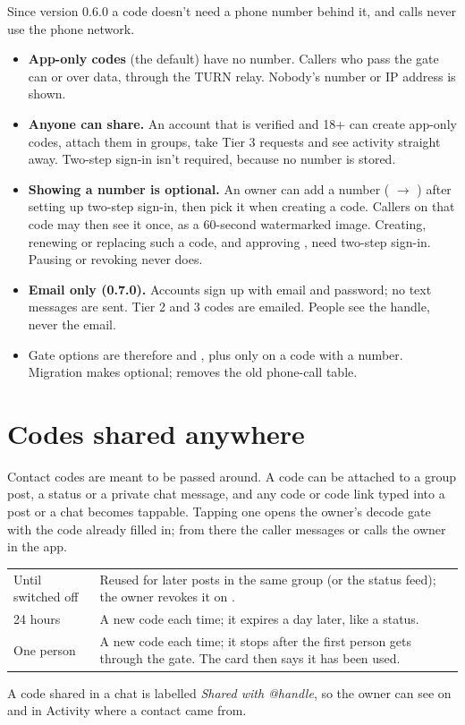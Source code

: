 Since version 0.6.0 a code doesn't need a phone number behind it, and calls never use the phone network.
\begin{itemize}
  \item \textbf{App-only codes} (the default) have no number. Callers who pass the gate can  or  over data, through the TURN relay. Nobody's number or IP address is shown.
  \item \textbf{Anyone can share.} An account that is verified and 18+ can create app-only codes, attach them in groups, take Tier 3 requests and see activity straight away. Two-step sign-in isn't required, because no number is stored.
  \item \textbf{Showing a number is optional.} An owner can add a number ( $\rightarrow$ ) after setting up two-step sign-in, then pick it when creating a code. Callers on that code may then see it once, as a 60-second watermarked image. Creating, renewing or replacing such a code, and approving , need two-step sign-in. Pausing or revoking never does.
  \item \textbf{Email only (0.7.0).} Accounts sign up with email and password; no text messages are sent. Tier 2 and 3 codes are emailed. People see the handle, never the email.
  \item Gate options are therefore  and , plus  only on a code with a number. Migration  makes  optional;  removes the old phone-call table.
\end{itemize}

\section{Codes shared anywhere}
\label{sec:codes-anywhere}

Contact codes are meant to be passed around. A code can be attached to a group post, a status or a private chat message, and any code or code link typed into a post or a chat becomes tappable. Tapping one opens the owner's decode gate with the code already filled in; from there the caller messages or calls the owner in the app.

\begin{tabularx}{\linewidth}{@{}L{3.4cm}Y@{}}
\toprule
{} &  \\
\midrule
Until switched off & Reused for later posts in the same group (or the status feed); the owner revokes it on . \\
24 hours & A new code each time; it expires a day later, like a status. \\
One person & A new code each time; it stops after the first person gets through the gate. The card then says it has been used. \\
\bottomrule
\end{tabularx}

A code shared in a chat is labelled \emph{Shared with @handle}, so the owner can see on  and in Activity where a contact came from.
